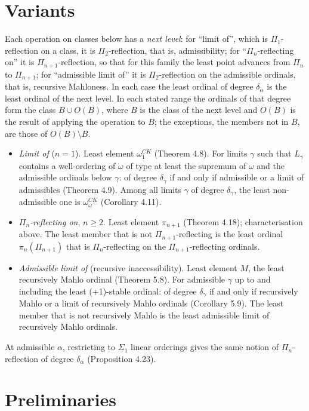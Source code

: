 \documentclass[11pt]{article}
\begin{document}
\section*{Variants}

Each operation on classes below has a \emph{next level}: for ``limit of'', which is
$\Pi_1$-reflection on a class, it is $\Pi_2$-reflection, that is, admissibility; for ``$\Pi_n$-reflecting on'' it is
$\Pi_{n+1}$-reflection, so that for this family the least point advances from $\Pi_n$ to $\Pi_{n+1}$; for ``admissible
limit of'' it is $\Pi_2$-reflection on the admissible ordinals, that is, recursive Mahloness. In each case the least
ordinal of degree $\delta_\alpha$ is the least ordinal of the next level. In each stated range the ordinals of that
degree form the class $B \cup O(B)$, where $B$ is the class of the next level and $O(B)$ is the result of applying the
operation to $B$; the exceptions, the members not in $B$, are those of $O(B) \setminus B$.
\begin{itemize}
\item \emph{Limit of} ($n = 1$). Least element $\omega_1^{CK}$ (Theorem 4.8). For limits $\gamma$ such that $L_\gamma$
  contains a well-ordering of $\omega$ of type at least the supremum of $\omega$ and the admissible ordinals below
  $\gamma$: of
  degree $\delta_\gamma$ if and only if admissible or a limit of admissibles (Theorem 4.9). Among all limits $\gamma$
  of degree $\delta_\gamma$, the least non-admissible one is $\omega_\omega^{CK}$ (Corollary 4.11).
\item \emph{$\Pi_n$-reflecting on}, $n \ge 2$. Least element $\pi_{n+1}$ (Theorem 4.18); characterisation above. The least
  member that is not $\Pi_{n+1}$-reflecting is the least ordinal $\pi_n(\Pi_{n+1})$ that is $\Pi_n$-reflecting on the
  $\Pi_{n+1}$-reflecting ordinals.
\item \emph{Admissible limit of} (recursive inaccessibility). Least element $M$, the least recursively Mahlo ordinal
  (Theorem 5.8). For admissible $\gamma$ up to and including the least (+1)-stable ordinal: of degree
  $\delta_\gamma$ if and only if recursively Mahlo or a limit of recursively Mahlo ordinals (Corollary 5.9). The least
  member that is not recursively Mahlo is the least admissible limit of recursively Mahlo ordinals.
\end{itemize}
At admissible $\alpha$, restricting to $\Sigma_1$ linear orderings gives the same notion of $\Pi_n$-reflection of
degree $\delta_\alpha$ (Proposition 4.23).

\section{Preliminaries}
\end{document}
